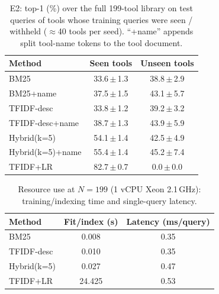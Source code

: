 \begin{table}[t]\centering\caption{E2: top-1 (\%) over the full 199-tool library on test queries of tools whose training queries were seen / withheld ($\approx$40 tools per seed). ``+name'' appends split tool-name tokens to the tool document.}\label{tab:e2}\small\begin{tabular}{lcc}\toprule Method & Seen tools & Unseen tools\\\midrule
BM25 & 33.6\,$\pm$\,1.3 & 38.8\,$\pm$\,2.9\\
BM25+name & 37.5\,$\pm$\,1.5 & 43.1\,$\pm$\,5.7\\
TFIDF-desc & 33.8\,$\pm$\,1.2 & 39.2\,$\pm$\,3.2\\
TFIDF-desc+name & 38.7\,$\pm$\,1.3 & 43.9\,$\pm$\,5.9\\
Hybrid(k=5) & 54.1\,$\pm$\,1.4 & 42.5\,$\pm$\,4.9\\
Hybrid(k=5)+name & 55.4\,$\pm$\,1.4 & 45.2\,$\pm$\,7.4\\
TFIDF+LR & 82.7\,$\pm$\,0.7 & 0.0\,$\pm$\,0.0\\
\bottomrule\end{tabular}\end{table}

\begin{table}[t]\centering\caption{E3: EAS$_c$ at $p_{out}{=}0.5$ (mean of 5 seeds): always answering vs.\ validation-tuned abstention. Abstention gain is positive by construction of the tuning (the threshold set includes ``answer all'') but is evaluated on held-out test data.}\label{tab:e3}\small{}\end{table}

\begin{table}[t]\centering\caption{Resource use at $N{=}199$ (1 vCPU Xeon 2.1\,GHz): training/indexing time and single-query latency.}\label{tab:eff}\small\begin{tabular}{lcc}\toprule Method & Fit/index (s) & Latency (ms/query)\\\midrule
BM25 & 0.008 & 0.35\\
TFIDF-desc & 0.010 & 0.35\\
Hybrid(k=5) & 0.027 & 0.47\\
TFIDF+LR & 24.425 & 0.53\\
\bottomrule\end{tabular}\end{table}

